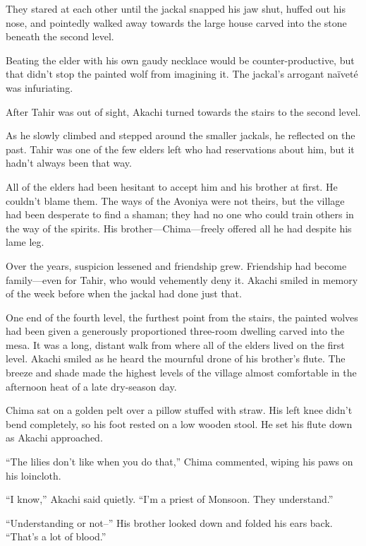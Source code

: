 They stared at each other until the jackal snapped his jaw shut, huffed out his nose, and pointedly walked away towards the large house carved into the stone beneath the second level.

Beating the elder with his own gaudy necklace would be counter-productive, but that didn't stop the painted wolf from imagining it. The jackal's arrogant naïveté was infuriating.

After Tahir was out of sight, Akachi turned towards the stairs to the second level.

\secdiv

\noindent As he slowly climbed and stepped around the smaller jackals, he reflected on the past. Tahir was one of the few elders left who had reservations about him, but it hadn't always been that way.

All of the elders had been hesitant to accept him and his brother at first. He couldn't blame them. The ways of the Avoniya were not theirs, but the village had been desperate to find a shaman; they had no one who could train others in the way of the spirits. His brother---Chima---freely offered all he had despite his lame leg.

Over the years, suspicion lessened and friendship grew. Friendship had become family---even for Tahir, who would vehemently deny it. Akachi smiled in memory of the week before when the jackal had done just that.

\secdiv

\noindent One end of the fourth level, the furthest point from the stairs, the painted wolves had been given a generously proportioned three-room dwelling carved into the mesa. It was a long, distant walk from where all of the elders lived on the first level. Akachi smiled as he heard the mournful drone of his brother's flute. The breeze and shade made the highest levels of the village almost comfortable in the afternoon heat of a late dry-season day.

Chima sat on a golden pelt over a pillow stuffed with straw. His left knee didn't bend completely, so his foot rested on a low wooden stool. He set his flute down as Akachi approached. 

``The lilies don't like when you do that,'' Chima commented, wiping his paws on his loincloth. 

``I know,'' Akachi said quietly. ``I'm a priest of Monsoon. They understand.''

``Understanding or not--'' His brother looked down and folded his ears back. ``That's a lot of blood.''

